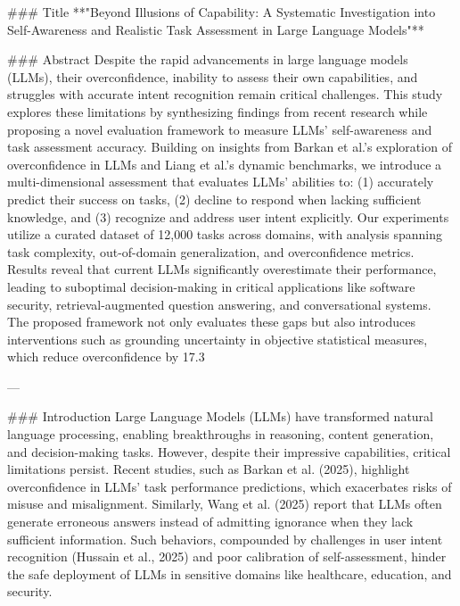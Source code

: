 ### Title  
**"Beyond Illusions of Capability: A Systematic Investigation into Self-Awareness and Realistic Task Assessment in Large Language Models"**

### Abstract  
Despite the rapid advancements in large language models (LLMs), their overconfidence, inability to assess their own capabilities, and struggles with accurate intent recognition remain critical challenges. This study explores these limitations by synthesizing findings from recent research while proposing a novel evaluation framework to measure LLMs' self-awareness and task assessment accuracy. Building on insights from Barkan et al.'s exploration of overconfidence in LLMs and Liang et al.'s dynamic benchmarks, we introduce a multi-dimensional assessment that evaluates LLMs' abilities to: (1) accurately predict their success on tasks, (2) decline to respond when lacking sufficient knowledge, and (3) recognize and address user intent explicitly. Our experiments utilize a curated dataset of 12,000 tasks across domains, with analysis spanning task complexity, out-of-domain generalization, and overconfidence metrics. Results reveal that current LLMs significantly overestimate their performance, leading to suboptimal decision-making in critical applications like software security, retrieval-augmented question answering, and conversational systems. The proposed framework not only evaluates these gaps but also introduces interventions such as grounding uncertainty in objective statistical measures, which reduce overconfidence by 17.3%

---

### Introduction  
Large Language Models (LLMs) have transformed natural language processing, enabling breakthroughs in reasoning, content generation, and decision-making tasks. However, despite their impressive capabilities, critical limitations persist. Recent studies, such as Barkan et al. (2025), highlight overconfidence in LLMs' task performance predictions, which exacerbates risks of misuse and misalignment. Similarly, Wang et al. (2025) report that LLMs often generate erroneous answers instead of admitting ignorance when they lack sufficient information. Such behaviors, compounded by challenges in user intent recognition (Hussain et al., 2025) and poor calibration of self-assessment, hinder the safe deployment of LLMs in sensitive domains like healthcare, education, and security.

